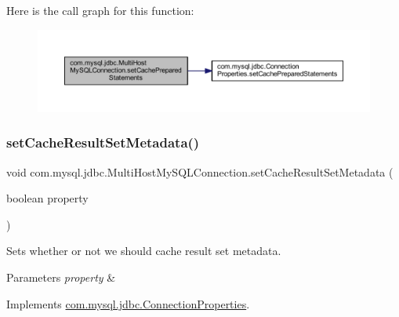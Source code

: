 Here is the call graph for this function\+:
\nopagebreak
\begin{figure}[H]
\begin{center}
\leavevmode
\includegraphics[width=350pt]{classcom_1_1mysql_1_1jdbc_1_1_multi_host_my_s_q_l_connection_a867db979855487f8231b63c63c2f1172_cgraph}
\end{center}
\end{figure}
\mbox{\label{classcom_1_1mysql_1_1jdbc_1_1_multi_host_my_s_q_l_connection_a2607114d6964b709318697a7aa065f5f}} 
\subsubsection{\texorpdfstring{set\+Cache\+Result\+Set\+Metadata()}{setCacheResultSetMetadata()}}
{\footnotesize\ttfamily void com.\+mysql.\+jdbc.\+Multi\+Host\+My\+S\+Q\+L\+Connection.\+set\+Cache\+Result\+Set\+Metadata (\begin{DoxyParamCaption}\item[{boolean}]{property }\end{DoxyParamCaption})}

Sets whether or not we should cache result set metadata.


\begin{DoxyParams}{Parameters}
{\em property} & \\
\hline
\end{DoxyParams}


Implements \mbox{\hyperlink{interfacecom_1_1mysql_1_1jdbc_1_1_connection_properties_abf45e0839d48fe28bb22d334118f807f}{com.\+mysql.\+jdbc.\+Connection\+Properties}}.

